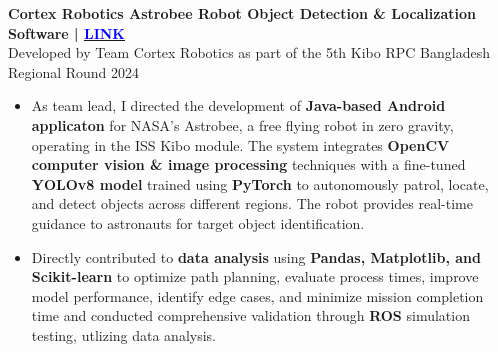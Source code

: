 \noindent
{\noindent\fontsize{12pt}{15pt}\bfseries Cortex Robotics Astrobee Robot Object Detection \& Localization Software | \href{https://www.linkedin.com/posts/humam-hossain-7ab762230_we-are-delighted-to-announce-that-cortex-activity-7216897808526630913-fK7n?utm_source=share&utm_medium=member_desktop&rcm=ACoAADnGy_MBOD27r03GQ-w_ksuO4sb1-cAV6_A}{\underline{\textcolor{blue}{LINK}}}} \\
{\fontsize{9pt}{11pt}Developed by Team Cortex Robotics as part of the 5th Kibo RPC Bangladesh Regional Round 2024}
\begin{itemize}[leftmargin=1em, itemsep=0.1em, labelsep=0.5em]
    \item As team lead, I directed the development of \textbf{Java-based Android applicaton} for NASA's Astrobee, a free flying robot in zero gravity, operating in the ISS Kibo module. The system integrates \textbf{OpenCV computer vision \& image processing} techniques with a fine-tuned \textbf{YOLOv8 model} trained using \textbf{PyTorch} to autonomously patrol, locate, and detect objects across different regions. The robot provides real-time guidance to astronauts for target object identification. 
    
    \item Directly contributed to \textbf{data analysis} using \textbf{Pandas, Matplotlib, and Scikit-learn} to optimize path planning, evaluate process times, improve model performance, identify edge cases, and minimize mission completion time and conducted comprehensive validation through \textbf{ROS} simulation testing, utlizing data analysis.
\end{itemize}